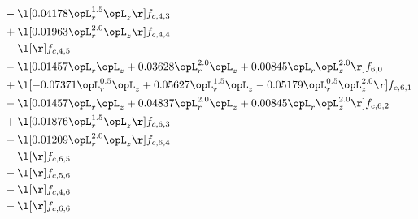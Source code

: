 \begin{alignat}{2}
& - \l[  0.04178 \opL_r^{1.5} \opL_z  \r] f_{c,4,3} \nonumber \\ 
& + \l[  0.01963 \opL_r^{2.0} \opL_z  \r] f_{c,4,4} \nonumber \\ 
& - \l[  \r] f_{c,4,5} \nonumber \\ 
& - \l[  0.01457 \opL_r \opL_z +  0.03628 \opL_r^{2.0} \opL_z +  0.00845 \opL_r \opL_z^{2.0}  \r] f_{6,0} \nonumber \\ 
& + \l[  -0.07371 \opL_r^{0.5} \opL_z +  0.05627 \opL_r^{1.5} \opL_z   -0.05179 \opL_r^{0.5} \opL_z^{2.0}  \r] f_{c,6,1} \nonumber \\ 
& - \l[  0.01457 \opL_r \opL_z +  0.04837 \opL_r^{2.0} \opL_z +  0.00845 \opL_r \opL_z^{2.0}  \r] f_{c,6,2} \nonumber \\ 
& + \l[  0.01876 \opL_r^{1.5} \opL_z  \r] f_{c,6,3} \nonumber \\ 
& - \l[  0.01209 \opL_r^{2.0} \opL_z  \r] f_{c,6,4} \nonumber \\ 
& - \l[  \r] f_{c,6,5} \nonumber \\ 
& - \l[  \r] f_{c,5,6} \nonumber \\ 
& - \l[  \r] f_{c,4,6} \nonumber \\ 
& - \l[  \r] f_{c,6,6} \nonumber \\ 
\end{alignat} 


